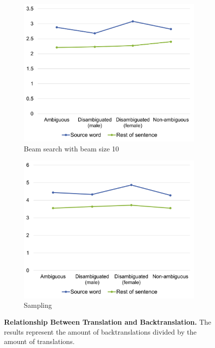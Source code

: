 \begin{figure}[!htb]
     \centering
     
     \begin{subfigure}{0.49\textwidth}
         \centering
         \includegraphics[width=\textwidth]{figures/correlation/translation_beam10.png}
         \caption{Beam search with beam size 10}
         \label{fig:correlation_translation_10}
     \end{subfigure}
     \hfill
     \begin{subfigure}{0.49\textwidth}
         \centering
         \includegraphics[width=\textwidth]{figures/correlation/translation_sampling.png}
         \caption{Sampling}
         \label{fig:correlation_translation_sampling}
     \end{subfigure}
     
    \caption{\textbf{Relationship Between Translation and Backtranslation.} The results represent the amount of backtranslations divided by the amount of translations.}
    \label{fig:correlation_translation}

\end{figure}


